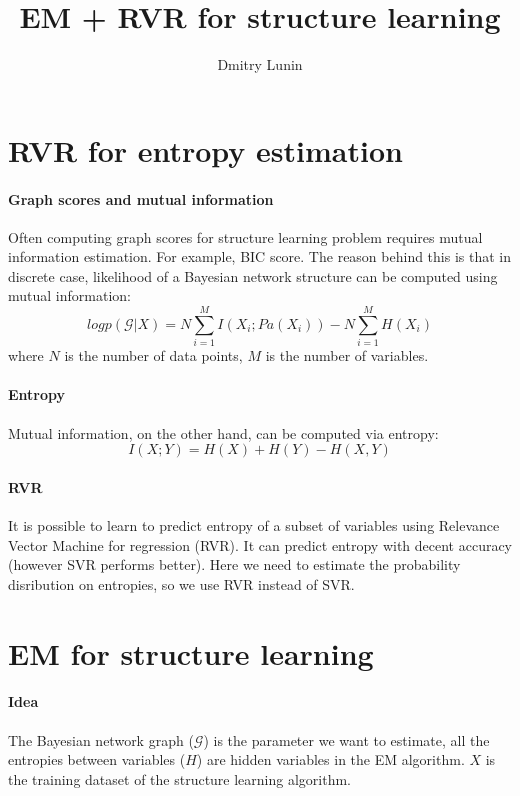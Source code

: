 \documentclass{article}
\author{Dmitry Lunin}
\title{EM + RVR for structure learning}
\newcommand{\graph}[1]{
	\mathcal{#1}
}
\begin{document}
\maketitle
	
\section{RVR for entropy estimation}
\paragraph{Graph scores and mutual information} Often computing graph scores for structure learning problem requires mutual information estimation. For example, BIC score. The reason behind this is that in discrete case, likelihood of a Bayesian network structure can be computed using mutual information:
\begin{equation}
	log p(\graph{G}|X) = N \sum_{i=1}^M{I(X_i; Pa(X_i))} - N \sum_{i=1}^M{H(X_i)}  
\end{equation}
where $N$ is the number of data points, $M$ is the number of variables.
\paragraph{Entropy} 
Mutual information, on the other hand, can be computed via entropy:
\begin{equation}
	I(X; Y) = H(X) + H(Y) - H(X, Y)
\end{equation}

\paragraph{RVR} It is possible to learn to predict entropy of a subset of variables using Relevance Vector Machine for regression (RVR). It can predict entropy with decent accuracy (however SVR performs better). Here we need to estimate the probability disribution on entropies, so we use RVR instead of SVR.

\section{EM for structure learning}
\paragraph{Idea} The Bayesian network graph ($\graph{G}$) is the parameter we want to estimate, all the entropies between variables ($H$) are hidden variables in the EM algorithm.
$X$ is the training dataset of the structure learning algorithm.
\end{document}
